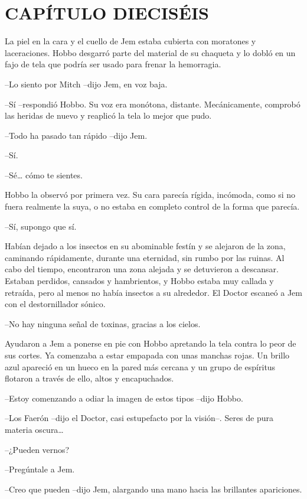 \chapter*{CAPÍTULO DIECISÉIS}

{La piel en la cara y el cuello de Jem estaba cubierta con moratones y
 laceraciones. Hobbo desgarró parte del material de su chaqueta y lo
 dobló en un fajo de tela que podría ser usado para frenar la
hemorragia.}

{--Lo siento por Mitch --dijo Jem, en voz baja.}

{--Sí --respondió Hobbo. Su voz era monótona, distante. Mecánicamente,
comprobó las heridas de nuevo y reaplicó la tela lo mejor que pudo.}

{--Todo ha pasado tan rápido --dijo Jem.}

{--Sí.}

{--Sé\ldots{} cómo te sientes.}

{Hobbo la observó por primera vez. Su cara parecía rígida, incómoda, como
 si no fuera realmente la suya, o no estaba en completo control de la
forma que parecía.}

{--Sí, supongo que sí.}

{Habían dejado a los insectos en su abominable festín y se alejaron de la
 zona, caminando rápidamente, durante una eternidad, sin rumbo por las
 ruinas. Al cabo del tiempo, encontraron una zona alejada y se detuvieron
 a descansar. Estaban perdidos, cansados y hambrientos, y Hobbo estaba
 muy callada y retraída, pero al menos no había insectos a su alrededor.
El Doctor escaneó a Jem con el destornillador sónico.}

{--No hay ninguna señal de toxinas, gracias a los cielos.}

{Ayudaron a Jem a ponerse en pie con Hobbo apretando la tela contra lo
 peor de sus cortes. Ya comenzaba a estar empapada con unas manchas
 rojas. Un brillo azul apareció en un hueco en la pared más cercana y un
grupo de espíritus flotaron a través de ello, altos y encapuchados.}

{--Estoy comenzando a odiar la imagen de estos tipos --dijo Hobbo.}

{--Los Faerón --dijo el Doctor, casi estupefacto por la visión--. Seres
 de pura materia oscura\ldots{}}

{--¿Pueden vernos?}

{--Pregúntale a Jem.}

{--Creo que pueden --dijo Jem, alargando una mano hacia las brillantes
apariciones.}

